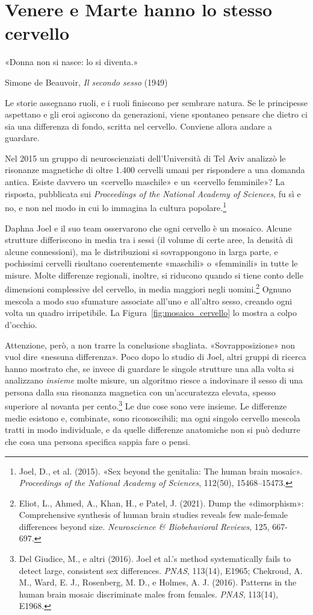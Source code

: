 \chapter{Venere e Marte hanno lo stesso cervello}
\label{cap:p2c20}

\epigraph{«Donna non si nasce: lo si diventa.»}{Simone de Beauvoir, \textit{Il secondo sesso} (1949)}

Le storie assegnano ruoli, e i ruoli finiscono per sembrare natura. Se le principesse aspettano e gli eroi agiscono da generazioni, viene spontaneo pensare che dietro ci sia una differenza di fondo, scritta nel cervello. Conviene allora andare a guardare.

Nel 2015 un gruppo di neuroscienziati dell'Università di Tel Aviv analizzò le risonanze magnetiche di oltre 1.400 cervelli umani per rispondere a una domanda antica. Esiste davvero un «cervello maschile» e un «cervello femminile»? La risposta, pubblicata sui \textit{Proceedings of the National Academy of Sciences}, fu sì e no, e non nel modo in cui lo immagina la cultura popolare.\footnote{Joel, D., et al. (2015). «Sex beyond the genitalia: The human brain mosaic». \textit{Proceedings of the National Academy of Sciences}, 112(50), 15468--15473.}

Daphna Joel e il suo team osservarono che ogni cervello è un mosaico. Alcune strutture differiscono in media tra i sessi (il volume di certe aree, la densità di alcune connessioni), ma le distribuzioni si sovrappongono in larga parte, e pochissimi cervelli risultano coerentemente «maschili» o «femminili» in tutte le misure. Molte differenze regionali, inoltre, si riducono quando si tiene conto delle dimensioni complessive del cervello, in media maggiori negli uomini.\footnote{Eliot, L., Ahmed, A., Khan, H., e Patel, J. (2021). Dump the «dimorphism»: Comprehensive synthesis of human brain studies reveals few male-female differences beyond size. \textit{Neuroscience \& Biobehavioral Reviews}, 125, 667-697.} Ognuno mescola a modo suo sfumature associate all'uno e all'altro sesso, creando ogni volta un quadro irripetibile. La Figura~\ref{fig:mosaico_cervello} lo mostra a colpo d'occhio.

Attenzione, però, a non trarre la conclusione sbagliata. «Sovrapposizione» non vuol dire «nessuna differenza». Poco dopo lo studio di Joel, altri gruppi di ricerca hanno mostrato che, se invece di guardare le singole strutture una alla volta si analizzano \textit{insieme} molte misure, un algoritmo riesce a indovinare il sesso di una persona dalla sua risonanza magnetica con un'accuratezza elevata, spesso superiore al novanta per cento.\footnote{Del Giudice, M., e altri (2016). Joel et al.'s method systematically fails to detect large, consistent sex differences. \textit{PNAS}, 113(14), E1965; Chekroud, A. M., Ward, E. J., Rosenberg, M. D., e Holmes, A. J. (2016). Patterns in the human brain mosaic discriminate males from females. \textit{PNAS}, 113(14), E1968.} Le due cose sono vere insieme. Le differenze medie esistono e, combinate, sono riconoscibili; ma ogni singolo cervello mescola tratti in modo individuale, e da quelle differenze anatomiche non si può dedurre che cosa una persona specifica sappia fare o pensi.

